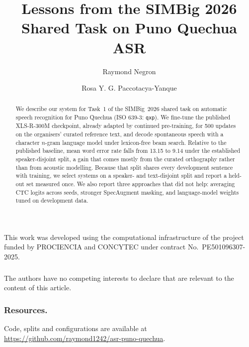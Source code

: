 \documentclass[runningheads]{llncs}
\begin{document}
\title{Lessons from the SIMBig 2026 Shared Task on Puno Quechua ASR}


\author{Raymond Negron \and Rosa Y. G. Paccotacya-Yanque}


\maketitle

\begin{abstract}
We describe our system for Task~1 of the SIMBig~2026 shared task on automatic
speech recognition for Puno Quechua (ISO 639-3: \texttt{qxp}). We fine-tune the
published XLS-R-300M checkpoint, already adapted by continued pre-training, for
500 updates on the organisers' curated reference text, and decode spontaneous
speech with a character $n$-gram language model under lexicon-free beam search.
Relative to the published baseline, mean word error rate falls from 13.15 to
9.14 under the established speaker-disjoint split, a gain that comes mostly
from the curated orthography rather than from acoustic modelling. Because that
split shares every development sentence with training, we select systems on a
speaker- and text-disjoint split and report a held-out set measured once. We
also report three approaches that did not help: averaging CTC logits across
seeds, stronger SpecAugment masking, and language-model weights tuned on
development data.

\end{abstract}










\begin{credits}
\subsubsection{\ackname}
This work was developed using the computational infrastructure of the project
funded by PROCIENCIA and CONCYTEC under contract No.~PE501096307-2025.

\subsubsection{\discintname}
The authors have no competing interests to declare that are relevant to the
content of this article.
\end{credits}

\subsubsection{Resources.} Code, splits and configurations are available at
\url{https://github.com/raymond1242/asr-puno-quechua}.



\end{document}

